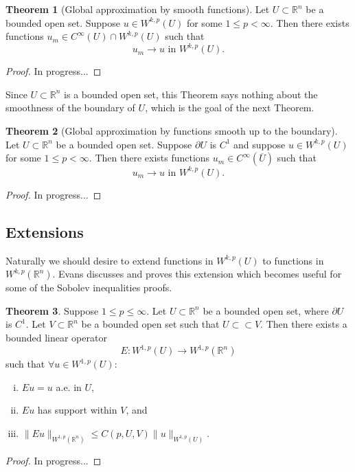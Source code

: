 \documentclass[11pt]{article}
\theoremstyle{definition}
\newtheorem*{theorem}{Theorem}
\begin{document}
\begin{theorem}[Global approximation by smooth functions]
	Let $U \subset \mathbb{R}^n$ be a bounded open set. Suppose $u \in W^{k,p}(U)$ for some $1 \leq p < \infty$. Then there exists functions $u_m \in C^{\infty}(U)\cap W^{k,p}(U)$ such that
	\[u_m \rightarrow u \text{ in } W^{k,p}(U).\]
\end{theorem}
\begin{proof}
In progress...
\end{proof}

Since $U \subset \mathbb{R}^n$ is a bounded open set, this Theorem says
nothing about the smoothness of the boundary of $U$, which is the goal of the next Theorem.

\begin{theorem}[Global approximation by functions smooth up to the boundary]
	Let $U \subset \mathbb{R}^n$ be a bounded open set. Suppose $\partial U$ is $C^1$ and suppose $u \in W^{k,p}(U)$ for some $1 \leq p < \infty$.
	Then there exists functions $u_m \in C^{\infty}(\overline{U})$ such that
	\[u_m \rightarrow u \text{ in } W^{k,p}(U).\]
\end{theorem}
\begin{proof}
In progress...
\end{proof}

\newpage

\subsection{Extensions}
Naturally we should desire to extend functions in $W^{k,p}(U)$ to functions in $W^{k,p}(\mathbb{R}^n)$.
Evans discusses and proves this extension which becomes useful for some of the Sobolev inequalities proofs.

\begin{theorem}
	Suppose $1 \leq p \leq \infty$.
Let $U \subset \mathbb{R}^n$ be a bounded open set, where $\partial U$ is $C^1$.
Let $V \subset \mathbb{R}^n$ be a bounded open set such that $U \subset\subset V$.
Then there exists a bounded linear operator
	\[E: W^{1,p}(U) \rightarrow W^{1,p}(\mathbb{R}^n)\]
such that $\forall u \in W^{1,p}(U)$:
	\begin{enumerate}[(i)]
		\item $Eu = u$ a.e. in $U$,
		\item $Eu$ has support within $V$, and
		\item $\|Eu\|_{W^{1,p}(\mathbb{R}^n)} \leq C(p,U,V)\|u\|_{W^{1,p}(U)}.$
	\end{enumerate}
\end{theorem}
\begin{proof}
In progress...
\end{proof}
\end{document}
